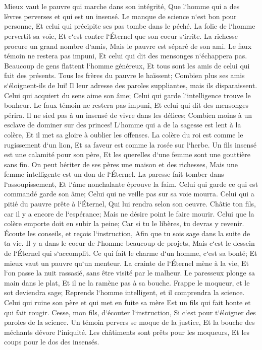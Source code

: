 \chapter{}

\verse Mieux vaut le pauvre qui marche dans son intégrité, Que l`homme qui a des lèvres perverses et qui est un insensé. 
\verse Le manque de science n`est bon pour personne, Et celui qui précipite ses pas tombe dans le péché. 
\verse La folie de l`homme pervertit sa voie, Et c`est contre l`Éternel que son coeur s`irrite. 
\verse La richesse procure un grand nombre d`amis, Mais le pauvre est séparé de son ami. 
\verse Le faux témoin ne restera pas impuni, Et celui qui dit des mensonges n`échappera pas. 
\verse Beaucoup de gens flattent l`homme généreux, Et tous sont les amis de celui qui fait des présents. 
\verse Tous les frères du pauvre le haïssent; Combien plus ses amis s`éloignent-ils de lui! Il leur adresse des paroles suppliantes, mais ils disparaissent. 
\verse Celui qui acquiert du sens aime son âme; Celui qui garde l`intelligence trouve le bonheur. 
\verse Le faux témoin ne restera pas impuni, Et celui qui dit des mensonges périra. 
\verse Il ne sied pas à un insensé de vivre dans les délices; Combien moins à un esclave de dominer sur des princes! 
\verse L`homme qui a de la sagesse est lent à la colère, Et il met sa gloire à oublier les offenses. 
\verse La colère du roi est comme le rugissement d`un lion, Et sa faveur est comme la rosée sur l`herbe. 
\verse Un fils insensé est une calamité pour son père, Et les querelles d`une femme sont une gouttière sans fin. 
\verse On peut hériter de ses pères une maison et des richesses, Mais une femme intelligente est un don de l`Éternel. 
\verse La paresse fait tomber dans l`assoupissement, Et l`âme nonchalante éprouve la faim. 
\verse Celui qui garde ce qui est commandé garde son âme; Celui qui ne veille pas sur sa voie mourra. 
\verse Celui qui a pitié du pauvre prête à l`Éternel, Qui lui rendra selon son oeuvre. 
\verse Châtie ton fils, car il y a encore de l`espérance; Mais ne désire point le faire mourir. 
\verse Celui que la colère emporte doit en subir la peine; Car si tu le libères, tu devras y revenir. 
\verse Écoute les conseils, et reçois l`instruction, Afin que tu sois sage dans la suite de ta vie. 
\verse Il y a dans le coeur de l`homme beaucoup de projets, Mais c`est le dessein de l`Éternel qui s`accomplit. 
\verse Ce qui fait le charme d`un homme, c`est sa bonté; Et mieux vaut un pauvre qu`un menteur. 
\verse La crainte de l`Éternel mène à la vie, Et l`on passe la nuit rassasié, sans être visité par le malheur. 
\verse Le paresseux plonge sa main dans le plat, Et il ne la ramène pas à sa bouche. 
\verse Frappe le moqueur, et le sot deviendra sage; Reprends l`homme intelligent, et il comprendra la science. 
\verse Celui qui ruine son père et qui met en fuite sa mère Est un fils qui fait honte et qui fait rougir. 
\verse Cesse, mon fils, d`écouter l`instruction, Si c`est pour t`éloigner des paroles de la science. 
\verse Un témoin pervers se moque de la justice, Et la bouche des méchants dévore l`iniquité. 
\verse Les châtiments sont prêts pour les moqueurs, Et les coups pour le dos des insensés. 

